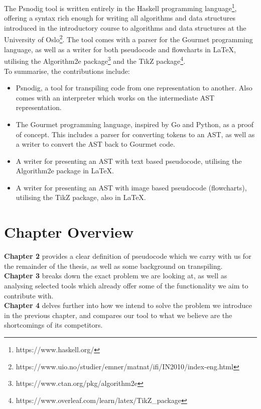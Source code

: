 The Psnodig tool is written entirely in the Haskell programming language\footnote{https://www.haskell.org/}, offering a syntax rich enough for writing all algorithms and data structures introduced in the introductory course to algorithms and data structures at the University of Oslo\footnote{https://www.uio.no/studier/emner/matnat/ifi/IN2010/index-eng.html}. The tool comes with a parser for the Gourmet programming language, as well as a writer for both pseudocode and flowcharts in \LaTeX, utilising the Algorithm2e package\footnote{https://www.ctan.org/pkg/algorithm2e} and the TikZ package\footnote{https://www.overleaf.com/learn/latex/TikZ\_package}. \hfill \\

To summarise, the contributions include:
\begin{itemize}
    \item Psnodig, a tool for transpiling code from one representation to another. Also comes with an interpreter which works on the intermediate AST representation.
    \item The Gourmet programming language, inspired by Go and Python, as a proof of concept. This includes a parser for converting tokens to an AST, as well as a writer to convert the AST back to Gourmet code.
    \item A writer for presenting an AST with text based pseudocode, utilising the Algorithm2e package in \LaTeX.
    \item A writer for presenting an AST with image based pseudocode (flowcharts), utilising the TikZ package, also in \LaTeX.
\end{itemize}

\section{Chapter Overview}

\textbf{Chapter 2} provides a clear definition of pseudocode which we carry with us for the remainder of the thesis, as well as some background on transpiling. \hfill \\

\textbf{Chapter 3} breaks down the exact problem we are looking at, as well as analysing selected tools which already offer some of the functionality we aim to contribute with. \hfill \\

\textbf{Chapter 4} delves further into how we intend to solve the problem we introduce in the previous chapter, and compares our tool to what we believe are the shortcomings of its competitors. \hfill \\

